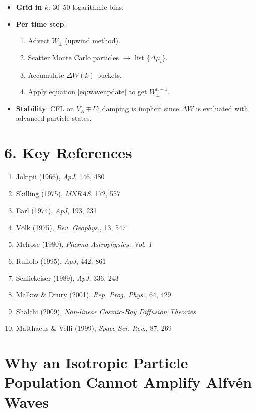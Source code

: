 \begin{itemize}
  \item \textbf{Grid in $k$}: 30--50 logarithmic bins.
  \item \textbf{Per time step}:
    \begin{enumerate}
      \item Advect $W_\pm$ (upwind method).
      \item Scatter Monte Carlo particles $\rightarrow$ list $\{\Delta\mu_i\}$.
      \item Accumulate $\Delta W(k)$ buckets.
      \item Apply equation \eqref{eq:waveupdate} to get $W_\pm^{n+1}$.
    \end{enumerate}
  \item \textbf{Stability}: CFL on $V_A \mp U$; damping is implicit since $\Delta W$ is evaluated with advanced particle states.
\end{itemize}

\section*{6. Key References}

\begin{enumerate}
    \item Jokipii (1966), \textit{ApJ}, 146, 480
    \item Skilling (1975), \textit{MNRAS}, 172, 557
    \item Earl (1974), \textit{ApJ}, 193, 231
    \item Völk (1975), \textit{Rev. Geophys.}, 13, 547
    \item Melrose (1980), \textit{Plasma Astrophysics, Vol. 1}
    \item Ruffolo (1995), \textit{ApJ}, 442, 861
    \item Schlickeiser (1989), \textit{ApJ}, 336, 243
    \item Malkov \& Drury (2001), \textit{Rep. Prog. Phys.}, 64, 429
    \item Shalchi (2009), \textit{Non-linear Cosmic-Ray Diffusion Theories}
    \item Matthaeus \& Velli (1999), \textit{Space Sci. Rev.}, 87, 269
\end{enumerate}


\section*{Why an Isotropic Particle Population Cannot Amplify Alfvén Waves}


